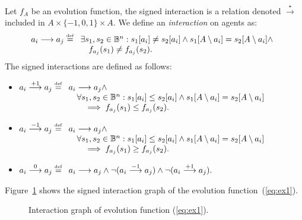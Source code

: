 \documentclass[12pt]{elsarticle}
\newcommand{\Bset}[0]{\mathbb{B}}
\newcommand{\eqdef}[0]{\stackrel{\scriptscriptstyle{\mathrm{def}}}{=}}
\begin{document}
\begin{definition}
\label{def:interaction}
Let $f_A$ be an evolution function, the signed interaction is a relation denoted $\stackrel{\star}{\longrightarrow}$included in $A\times\{-1,0,1 \}\times A$. We define an \emph{interaction} on agents as: 
$$ a_i \longrightarrow a_j \eqdef 
	\begin{array}[t]{l}
	\exists s_1,s_2 \in \Bset^n: s_1[a_i] \neq s_2[a_i] \wedge s_1[A \setminus a_i] = s_2 [A \setminus a_i] \wedge \\
 \quad f_{a_j}(s_1) \neq f_{a_j}(s_2).
	\end{array}
$$
The signed interactions are defined as follows: 
\begin{itemize}
\item $ a_i \stackrel{+1}{\longrightarrow} a_j \eqdef 	\begin{array}[t]{l}
 a_i \longrightarrow a_j \wedge \\
\quad \forall s_1,s_2 \in \Bset^n: s_1[a_i] \leq s_2[a_i] \wedge s_1[A \setminus a_i] = s_2 [A \setminus a_i] \\
\qquad \implies f_{a_j}(s_1) \leq f_{a_j}(s_2).
\end{array}
$ 
\item $ a_i \stackrel{-1}{\longrightarrow} a_j \eqdef
	\begin{array}[t]{l}
 a_i \longrightarrow a_j \wedge \\
\quad \forall s_1,s_2 \in \Bset^n: s_1[a_i] \leq s_2[a_i] \wedge s_1[A \setminus a_i] = s_2 [A \setminus a_i] \\
\qquad \implies f_{a_j}(s_1) \geq f_{a_j}(s_2).
\end{array}$ 
\item $ a_i \stackrel{0}{\longrightarrow} a_j \eqdef 
	\begin{array}[t]{l}
 a_i \longrightarrow a_j \wedge \neg (a_i \stackrel{-1}{\longrightarrow} a_j) \wedge \neg (a_i \stackrel{+1}{\longrightarrow} a_j). 
\end{array}$ 
\end{itemize}
\end{definition}
Figure~\ref{fig:inet-ex1} shows the signed interaction graph of the evolution function~(\ref{eq:ex1}). 

\begin{figure}[ht]
\begin{center}
\end{center}
\caption{Interaction graph of evolution function (\ref{eq:ex1}). }
\label{fig:inet-ex1}
\end{figure}
\end{document}
